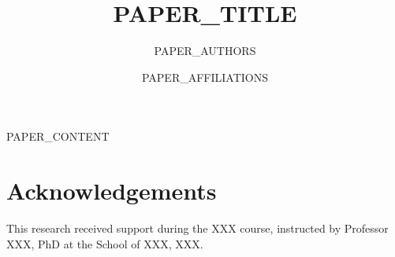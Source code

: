 \documentclass[twocolumn]{NobArticle}
\title{PAPER_TITLE}
\author{PAPER_AUTHORS}
\date{PAPER_AFFILIATIONS}
\begin{document}
\small
\maketitle

PAPER_CONTENT

\section*{Acknowledgements}
This research received support during the XXX course, instructed by Professor XXX, PhD at the School of XXX, XXX.

\printbibliography
\end{document}
